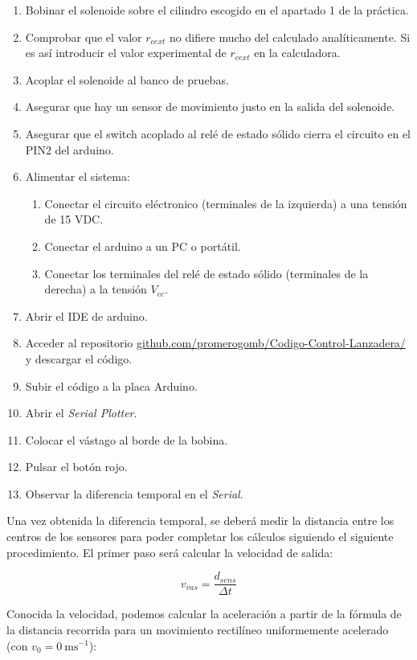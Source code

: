 \begin{enumerate}
    \item Bobinar el solenoide sobre el cilindro escogido en el apartado 1 de la práctica.
    \item Comprobar que el valor \(r_{cext}\) no difiere mucho del calculado analíticamente. Si es así introducir el valor experimental de \(r_{cext}\) en la calculadora.
    \item Acoplar el solenoide al banco de pruebas.
    \item Asegurar que hay un sensor de movimiento justo en la salida del solenoide.
    \item Asegurar que el switch acoplado al relé de estado sólido cierra el circuito en el PIN2 del arduino.
    \item Alimentar el sistema:
    \begin{enumerate}
        \item Conectar el circuito eléctronico (terminales de la izquierda) a una tensión de 15 VDC.
        \item Conectar el arduino a un PC o portátil.
        \item Conectar los terminales del relé de estado sólido (terminales de la derecha) a la tensión \(V_{cc}\).
    \end{enumerate}
    \item Abrir el IDE de arduino.
    \item Acceder al repositorio \href{URL}{github.com/promerogomb/Codigo-Control-Lanzadera/} y descargar el código.
    \item Subir el código a la placa Arduino.
    \item Abrir el \textit{Serial Plotter}.
    \item Colocar el vástago al borde de la bobina.
    \item Pulsar el botón rojo.
    \item Observar la diferencia temporal en el \textit{Serial}.
\end{enumerate}

Una vez obtenida la diferencia temporal, se deberá medir la distancia entre los centros de los sensores para poder completar los cálculos siguiendo el siguiente procedimiento. El primer paso será calcular la velocidad de salida:

\[v_{vas}=\frac{d_{sens}}{\Delta t}\]

Conocida la velocidad, podemos calcular la aceleración a partir de la fórmula de la distancia recorrida para un movimiento rectilíneo uniformemente acelerado (con \(v_0 = 0~\text{ms}^{-1}\)):

